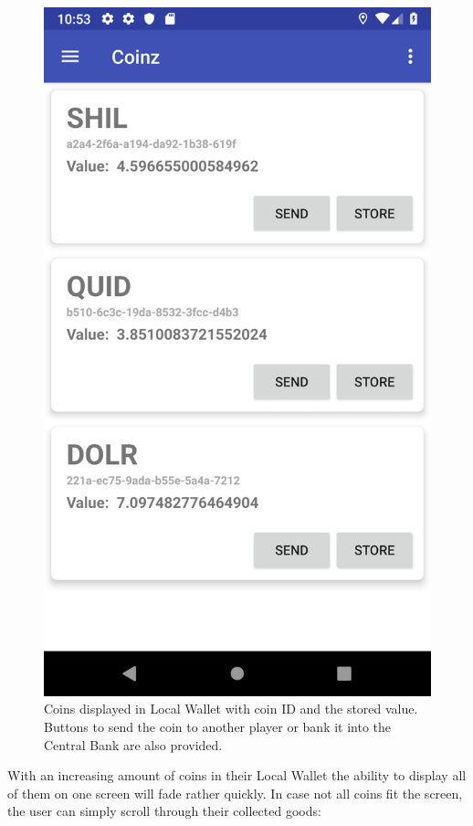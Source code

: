 \documentclass[11pt,a4paper,notitlepage]{article}
\begin{document}
\begin{figure}[H]
    \centering
    \includegraphics[scale=0.25]{screenshots/local-wallet/local-wallet-after-coin-store.png}
    \caption{Coins displayed in Local Wallet with coin ID and the stored value. Buttons to send the coin to another player or bank it into the Central Bank are also provided.}
\end{figure}

    With an increasing amount of coins in their Local Wallet the ability to display all of them on one screen will fade rather quickly. In case not all coins fit the screen, the user can simply scroll through their collected goods:
\end{document}

